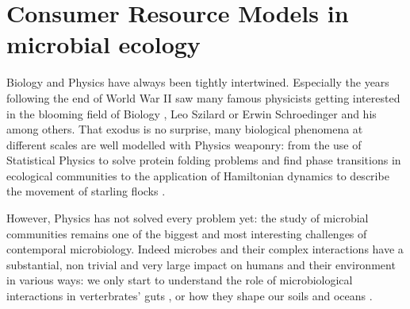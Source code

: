 \documentclass[12pt, titlepage]{report}
\begin{document}
\section{Consumer Resource
 Models in microbial ecology}

Biology and Physics have always been tightly intertwined. Especially the years following the end of World War II saw many famous physicists getting interested in the blooming field of Biology \cite{jogalekar_physicists_nodate}, Leo Szilard or Erwin Schroedinger and his  \cite{schrodinger_what_1944} among others. That exodus is no surprise, many biological phenomena at different scales are well modelled with Physics weaponry: from the use of Statistical Physics to solve protein folding problems \cite{chan_protein_1993} and find phase transitions in ecological communities \cite{fisher_transition_2014} to the application of Hamiltonian dynamics to describe the movement of starling flocks \cite{attanasi_information_2014}.


However, Physics has not solved every problem yet: the study of microbial communities remains one of the biggest and most interesting challenges of contemporal microbiology. Indeed microbes and their complex interactions have a substantial, non trivial and very large impact on humans and their environment in various ways: we only start to understand the role of microbiological interactions in verterbrates' guts \cite{ley_worlds_2008}, or how they shape our soils \cite{becerra-castro_wastewater_2015} and oceans \cite{falkowski_biogeochemical_1998}.
\end{document}
